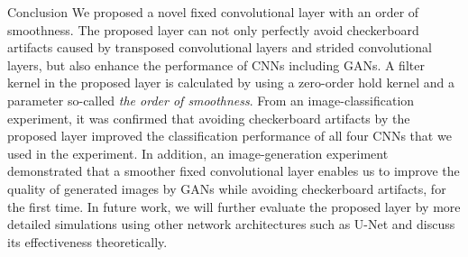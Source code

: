 \documentclass{article}
\makeatletter
\renewcommand\section{\@startsection{section}{1}{\z@}
                      {0.5ex \@plus 0ex \@minus -2ex}
                      {0.5ex \@plus 0ex}
                      {\normalfont\Large\bfseries}}
\makeatother
\begin{document}
\section{Conclusion}
  We proposed a novel fixed convolutional layer with an order of smoothness.
  The proposed layer can not only perfectly avoid
  checkerboard artifacts caused by transposed convolutional layers
  and strided convolutional layers,
  but also enhance the performance of CNNs including GANs.
  A filter kernel in the proposed layer
  is calculated by using a zero-order hold kernel
  and a parameter so-called \textit{the order of smoothness}.
  From an image-classification experiment,
  it was confirmed that avoiding checkerboard artifacts by the proposed layer
  improved the classification performance of all four CNNs
  that we used in the experiment.
  In addition,
  an image-generation experiment demonstrated that
  a smoother fixed convolutional layer enables us to improve
  the quality of generated images by GANs while avoiding
  checkerboard artifacts,
  for the first time.
  In future work,
  we will further evaluate the proposed layer by more detailed simulations
  using other network architectures such as U-Net
  and discuss its effectiveness theoretically.
\end{document}
